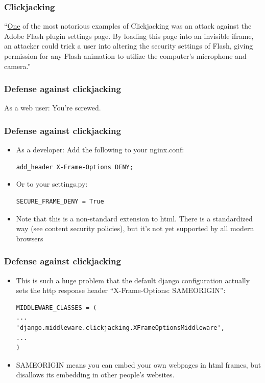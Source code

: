 \documentclass[9pt]{beamer}
\begin{document}
\begin{frame}[fragile]
\frametitle{Clickjacking}
``\href{https://www.owasp.org/index.php/Clickjacking}{One} of the most notorious examples of Clickjacking was an attack against the Adobe Flash plugin settings page. By loading this page into an invisible iframe, an attacker could trick a user into altering the security settings of Flash, giving permission for any Flash animation to utilize the computer's microphone and camera.''
\end{frame}

\begin{frame}[fragile]
\frametitle{Defense against clickjacking}
As a web user: You're screwed.
\end{frame}

\begin{frame}[fragile]
\frametitle{Defense against clickjacking}
\begin{itemize}
\item As a developer: Add the following to your nginx.conf:
\begin{verbatim}
add_header X-Frame-Options DENY;
\end{verbatim}
\pause
\item Or to your settings.py:
\begin{verbatim}
SECURE_FRAME_DENY = True
\end{verbatim}
\pause
\item Note that this is a non-standard extension to html. There is a standardized way (see content security policies), but it's not yet supported by all modern browsers
\end{itemize}
\end{frame}

\begin{frame}[fragile]
\frametitle{Defense against clickjacking}
\begin{itemize}
\item This is such a huge problem that the default django configuration actually sets the http response header ``X-Frame-Options: SAMEORIGIN'':
\begin{verbatim}
MIDDLEWARE_CLASSES = (
...
'django.middleware.clickjacking.XFrameOptionsMiddleware',
...
)
\end{verbatim}
\pause
\item SAMEORIGIN means you can embed your own webpages in html frames, but disallows its embedding in other people's websites.
\end{itemize}
\end{frame}
\end{document}
